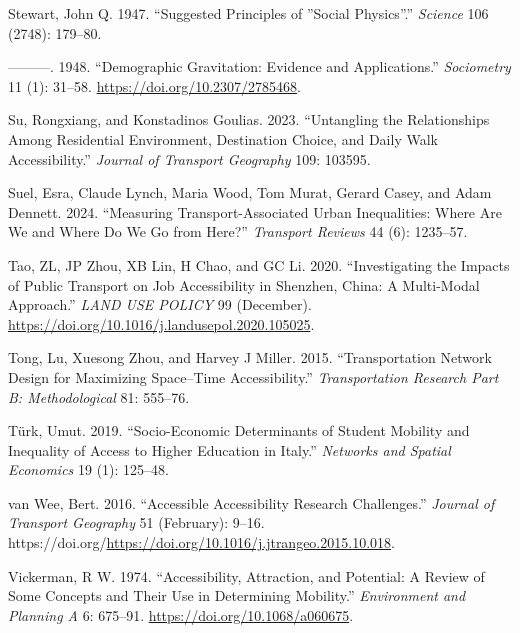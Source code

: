 \documentclass[
]{article}
\newlength{\cslhangindent}
\newenvironment{CSLReferences}[2] %
 {\begin{list}{}{%
  \setlength{\itemindent}{0pt}
  \setlength{\leftmargin}{0pt}
  \setlength{\parsep}{0pt}
  \ifodd #1
   \setlength{\leftmargin}{\cslhangindent}
   \setlength{\itemindent}{-1\cslhangindent}
  \fi
  \setlength{\itemsep}{#2\baselineskip}}}
 {\end{list}}
\begin{document}
\begin{CSLReferences}{1}{0}
Stewart, John Q. 1947. {``Suggested {Principles} of ''{Social}
{Physics}''.''} \emph{Science} 106 (2748): 179--80.

---------. 1948. {``Demographic Gravitation: Evidence and
Applications.''} \emph{Sociometry} 11 (1): 31--58.
\url{https://doi.org/10.2307/2785468}.

Su, Rongxiang, and Konstadinos Goulias. 2023. {``Untangling the
Relationships Among Residential Environment, Destination Choice, and
Daily Walk Accessibility.''} \emph{Journal of Transport Geography} 109:
103595.

Suel, Esra, Claude Lynch, Maria Wood, Tom Murat, Gerard Casey, and Adam
Dennett. 2024. {``Measuring Transport-Associated Urban Inequalities:
Where Are We and Where Do We Go from Here?''} \emph{Transport Reviews}
44 (6): 1235--57.

Tao, ZL, JP Zhou, XB Lin, H Chao, and GC Li. 2020. {``Investigating the
Impacts of Public Transport on Job Accessibility in {Shenzhen}, {China}:
A Multi-Modal Approach.''} \emph{LAND USE POLICY} 99 (December).
\url{https://doi.org/10.1016/j.landusepol.2020.105025}.

Tong, Lu, Xuesong Zhou, and Harvey J Miller. 2015. {``Transportation
Network Design for Maximizing Space--Time Accessibility.''}
\emph{Transportation Research Part B: Methodological} 81: 555--76.

Türk, Umut. 2019. {``Socio-Economic Determinants of Student Mobility and
Inequality of Access to Higher Education in Italy.''} \emph{Networks and
Spatial Economics} 19 (1): 125--48.

van Wee, Bert. 2016. {``Accessible Accessibility Research Challenges.''}
\emph{Journal of Transport Geography} 51 (February): 9--16.
https://doi.org/\url{https://doi.org/10.1016/j.jtrangeo.2015.10.018}.

Vickerman, R W. 1974. {``Accessibility, Attraction, and Potential: A
Review of Some Concepts and Their Use in Determining Mobility.''}
\emph{Environment and Planning A} 6: 675--91.
\url{https://doi.org/10.1068/a060675}.


\end{CSLReferences}
\end{document}
